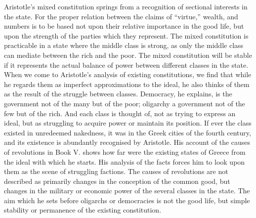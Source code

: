 Aristotle's mixed constitution springs from a recognition of sectional
interests in the state. For the proper relation between the claims of
``virtue,'' wealth, and numbers is to be based not upon their relative
importance in the good life, but upon the strength of the parties which
they represent. The mixed constitution is practicable in a state where the
middle class is strong, as only the middle class can mediate between the
rich and the poor. The mixed constitution will be stable if it represents
the actual balance of power between different classes in the state. When
we come to Aristotle's analysis of existing constitutions, we find that
while he regards them as imperfect approximations to the ideal, he also
thinks of them as the result of the struggle between classes. Democracy,
he explains, is the government not of the many but of the poor; oligarchy
a government not of the few but of the rich. And each class is thought of,
not as trying to express an ideal, but as struggling to acquire power or
maintain its position. If ever the class existed in unredeemed nakedness,
it was in the Greek cities of the fourth century, and its existence is
abundantly recognised by Aristotle. His account of the causes of
revolutions in Book V. shows how far were the existing states of Greece
from the ideal with which he starts. His analysis of the facts forces him
to look upon them as the scene of struggling factions. The causes of
revolutions are not described as primarily changes in the conception of
the common good, but changes in the military or economic power of the
several classes in the state. The aim which he sets before oligarchs or
democracies is not the good life, but simple stability or permanence of
the existing constitution.

